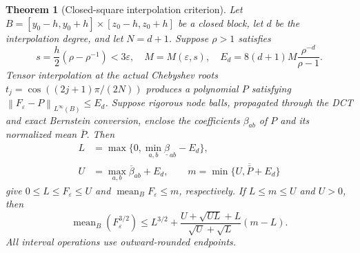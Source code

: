 \documentclass[11pt,a4paper]{article}
\newtheorem{theorem}{Theorem}[section]
\theoremstyle{definition}\newtheorem{definition}[theorem]{Definition}
\theoremstyle{remark}\newtheorem{remark}[theorem]{Remark}
\newcommand{\norm}[1]{\left\lVert#1\right\rVert}
\DeclareMathOperator{\mean}{mean}
\begin{document}
\begin{theorem}[Closed-square interpolation criterion]\label{thm:certificate}
Let $B=[y_0-h,y_0+h]\times[z_0-h,z_0+h]$ be a closed block, let $d$ be the interpolation degree, and let $N=d+1$. Suppose $\rho>1$ satisfies
\[
 s=\frac h2(\rho-\rho^{-1})<3\varepsilon,
 \quad M=M(\varepsilon,s),\quad
 E_d=8(d+1)M\frac{\rho^{-d}}{\rho-1}.
\]
Tensor interpolation at the actual Chebyshev roots $t_j=\cos((2j+1)\pi/(2N))$ produces a polynomial $P$ satisfying $\norm{F_\varepsilon-P}_{L^\infty(B)}\le E_d$.
Suppose rigorous node balls, propagated through the DCT and exact Bernstein conversion, enclose the coefficients $\beta_{ab}$ of $P$ and its normalized mean $\bar P$. Then
\begin{align}\label{eq:range}
 L&=\max\{0,\min_{a,b}\underline\beta_{ab}-E_d\},\\
 U&=\max_{a,b}\overline\beta_{ab}+E_d,
 \qquad m=\min\{U,\overline{\bar P}+E_d\}
\end{align}
give $0\le L\le F_\varepsilon\le U$ and $\mean_BF_\varepsilon\le m$, respectively. If $L\le m\le U$ and $U>0$, then
\begin{equation}\label{eq:chord}
 \mean_B(F_\varepsilon^{3/2})
 \le L^{3/2}+
 \frac{U+\sqrt{UL}+L}{\sqrt U+\sqrt L}(m-L).
\end{equation}
All interval operations use outward-rounded endpoints.
\end{theorem}
\end{document}
